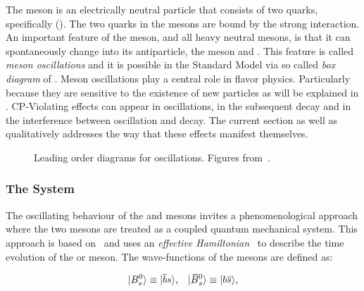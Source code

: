 The \Bs meson is an electrically neutral particle that consists of two quarks, specifically (\bquarkbar\squark).
The two quarks in the mesons are bound by the strong interaction. An important feature of
the \Bs meson, and all heavy neutral mesons, is that it can spontaneously change into its antiparticle,
the \Bsb meson and \viceversa. This feature is called {\it meson oscillations} and it is possible
in the Standard Model via so called {\it box diagram} of .
Meson oscillations play a central role in flavor physics. Particularly because they are sensitive to the
existence of new particles as will be explained in . CP-Violating effects can
appear in \BBbarSyst oscillations, in the subsequent decay and in the interference between oscillation
and decay. The current section as well as  qualitatively addresses the way that
these effects manifest themselves.

\begin{figure}[!h]
  \centering
  \begin{subfigure}{0.5\textwidth}
    \centering
    \scalebox{0.9}{\sffamily }
    \caption{}
    \label{bs_box_1}
  \end{subfigure}%
  \begin{subfigure}{0.5\textwidth}
    \centering
    \scalebox{0.9}{\sffamily }
    \caption{}
    \label{bs_box_2}
  \end{subfigure}
  \caption{Leading order diagrams for \BBbarSyst oscillations. Figures from~\cite{jeroenThesis}.}
  \label{bs_box}
\end{figure}

\subsubsection{The \BBbarSyst System}
\label{the_bbar_system}

The oscillating behaviour of the \Bs and \Bsb mesons invites a phenomenological approach
where the two mesons are treated as a coupled quantum mechanical system. This approach
is based on~\cite{Weisskopf:1930au,Weisskopf:1930ps} and uses an {\it effective Hamiltonian}~\cite{eff-hamiltonian-bs-syst,DeBruyn-thesis}
to describe the time evolution of the \Bs or \Bsb meson. The wave-functions of the mesons
are defined as:

\begin{equation}
  \centering
  \ket{\Bs}  \equiv  \ket{\bquarkbar\squark}, \;\;\; \ket{\Bsb} \equiv  \ket{\bquark\squarkbar},
  \label{bs_wavefunctions}
\end{equation}


